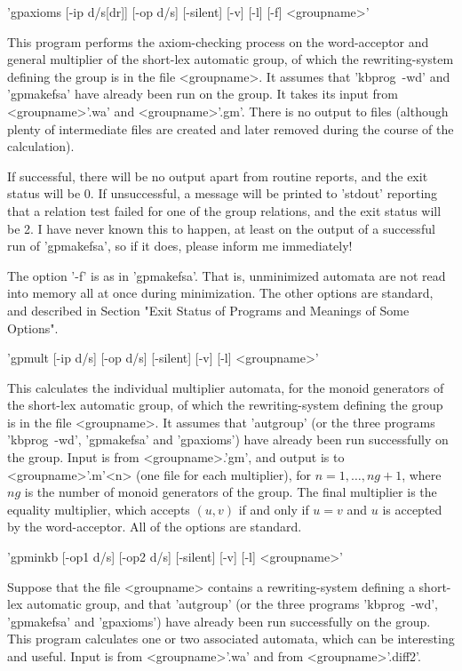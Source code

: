 'gpaxioms [-ip d/s[dr]] [-op d/s] [-silent] [-v] [-l] [-f] <groupname>'

This program performs the axiom-checking process on the word-acceptor and
general multiplier of the short-lex automatic group,
of which the rewriting-system defining the group is in the file <groupname>.
It assumes that 'kbprog\ -wd' and 'gpmakefsa' have already been run on the
group.
It takes its input from <groupname>'.wa' and <groupname>'.gm'. 
There is no output to files (although plenty of intermediate files are
created and later removed during the course of the calculation).

If successful, there will be no output apart from routine reports, and the exit
status will be 0. If unsuccessful, a message will be printed to 'stdout'
reporting that a relation test failed for one of the group relations, and
the exit status will be 2. I have never known this to happen, at least on
the output of a successful run of 'gpmakefsa', so if it does, please inform
me immediately!

The option '-f' is as in 'gpmakefsa'. That is, unminimized automata are not
read into memory all at once during minimization.
The other options are standard, and described in Section 
"Exit Status of Programs and Meanings of Some Options".

'gpmult [-ip d/s] [-op d/s] [-silent] [-v] [-l] <groupname>'

This calculates the individual multiplier automata, for the monoid
generators of the short-lex automatic group, of which the rewriting-system
defining the group is in the file <groupname>.
It assumes that 'autgroup' (or the three programs 'kbprog\ -wd', 'gpmakefsa'
and 'gpaxioms') have already been run successfully on the group.
Input is from <groupname>.'gm', and output is to <groupname>'.m'<n>
(one file for each multiplier), for $n = 1, \ldots , ng+1$, where $ng$ is
the number of monoid generators of the group. The final multiplier is
the equality multiplier, which accepts $(u,v)$ if and only if $u = v$ and
$u$ is accepted by the word-acceptor.
All of the options are standard.

'gpminkb [-op1 d/s] [-op2 d/s] [-silent] [-v] [-l] <groupname>'

Suppose that the file <groupname> contains a rewriting-system
defining a short-lex automatic group,
and that 'autgroup' (or the three programs 'kbprog\ -wd', 'gpmakefsa'
and 'gpaxioms') have already been run successfully on the group.
This program calculates one or two associated automata, which can be
interesting and useful. Input is from <groupname>'.wa' and from
<groupname>'.diff2'.

